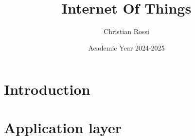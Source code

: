 \documentclass[12pt, a4paper]{report}
\title{\textbf{Internet Of Things}}
\author{Christian Rossi}
\date{Academic Year 2024-2025}
\begin{document}
    \maketitle

    

    \cleardoublepage{}

    \tableofcontents

    \cleardoublepage{}

    \chapter{Introduction}
    
    
    

    \chapter{Application layer}
    
    
    
\end{document}
